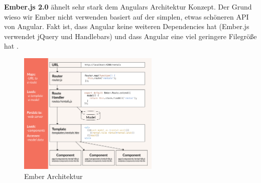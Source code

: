 \textbf{Ember.js 2.0} ähnelt sehr stark dem Angulars Architektur Konzept. Der Grund wieso wir Ember nicht verwenden basiert auf der simplen, etwas schöneren API von Angular. Fakt ist, dass Angular keine weiteren Dependencies hat (Ember.js verwendet jQuery und Handlebars) und dass Angular eine viel geringere Filegröße hat \cite{MELD.CH3-web-app.ember}.

\begin{figure}[!htb]\centering
	\includegraphics[width=0.6\textwidth]{images/ember}
	\caption{Ember Architektur \cite{MELD.CH3-web-app.ember}}
\end{figure}

\clearpage

